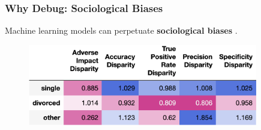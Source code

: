 \documentclass[11pt,
               aspectratio=169,
               hyperref={colorlinks}
               ]{beamer}
\begin{document}
			\begin{frame}[label={slide:disp}]
		
				\frametitle{Why Debug: Sociological Biases}
		
				\footnotesize{Machine learning models can perpetuate \textbf{sociological biases} \cite{barocas-hardt-narayanan}.}
				\vspace{10pt}	
				\begin{figure}
					\begin{center}
						\includegraphics[height=100pt]{../img/di.png}
					\end{center}
				\end{figure}
				\normalsize
		
			\end{frame}
	
\end{document}
